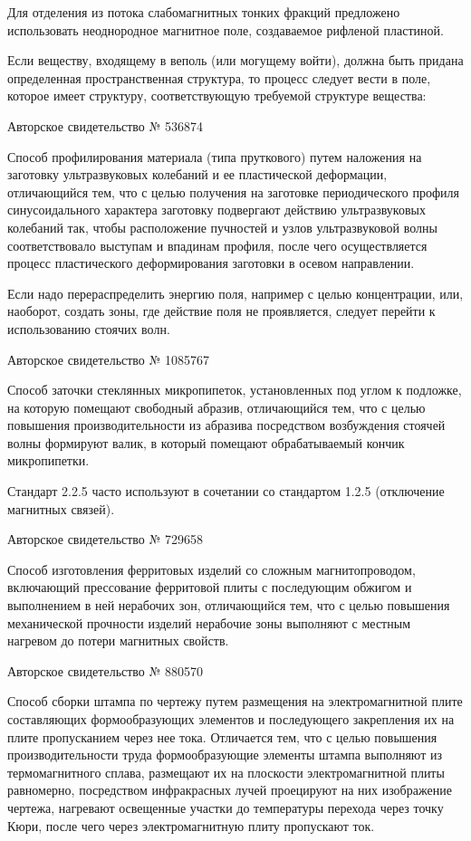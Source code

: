 Для  отделения  из  потока слабомагнитных  тонких  фракций  предложено
использовать   неоднородное  магнитное   поле,  создаваемое   рифленой
пластиной.

Если веществу,  входящему в веполь  (или могущему войти),  должна быть
придана  определенная пространственная  структура, то  процесс следует
вести  в  поле,  которое имеет  структуру,  соответствующую  требуемой
структуре вещества:


Авторское свидетельство № 536874

Способ профилирования  материала (типа пруткового) путем  наложения на
заготовку  ультразвуковых  колебаний  и  ее  пластической  деформации,
отличающийся тем,  что с  целью получения на  заготовке периодического
профиля  синусоидального   характера  заготовку   подвергают  действию
ультразвуковых  колебаний так,  чтобы расположение  пучностей и  узлов
ультразвуковой  волны  соответствовало  выступам и  впадинам  профиля,
после   чего  осуществляется   процесс  пластического   деформирования
заготовки в осевом направлении.

Если   надо   перераспределить   энергию  поля,   например   с   целью
концентрации,  или,  наоборот,  создать  зоны, где  действие  поля  не
проявляется, следует перейти к использованию стоячих волн.


Авторское свидетельство № 1085767

Способ  заточки стеклянных  микропипеток,  установленных  под углом  к
подложке,  на которую  помещают свободный  абразив, отличающийся  тем,
что  с  целью  повышения производительности  из  абразива  посредством
возбуждения  стоячей   волны  формируют  валик,  в   который  помещают
обрабатываемый кончик микропипетки.

Стандарт  2.2.5  часто  используют  в сочетании  со  стандартом  1.2.5
(отключение магнитных связей).


Авторское свидетельство № 729658

Способ  изготовления ферритовых  изделий  со сложным  магнитопроводом,
включающий  прессование  ферритовой  плиты  с  последующим  обжигом  и
выполнением  в  ней  нерабочих  зон, отличающийся  тем,  что  с  целью
повышения механической  прочности изделий  нерабочие зоны  выполняют с
местным нагревом до потери магнитных свойств.


Авторское свидетельство № 880570

Способ сборки  штампа по чертежу путем  размещения на электромагнитной
плите   составляющих   формообразующих    элементов   и   последующего
закрепления  их  на  плите  пропусканием через  нее  тока.  Отличается
тем, что  с целью  повышения производительности  труда формообразующие
элементы штампа  выполняют из термомагнитного сплава,  размещают их на
плоскости электромагнитной плиты  равномерно, посредством инфракрасных
лучей  проецируют на  них  изображение  чертежа, нагревают  освещенные
участки до  температуры перехода  через точку  Кюри, после  чего через
электромагнитную плиту пропускают ток.


